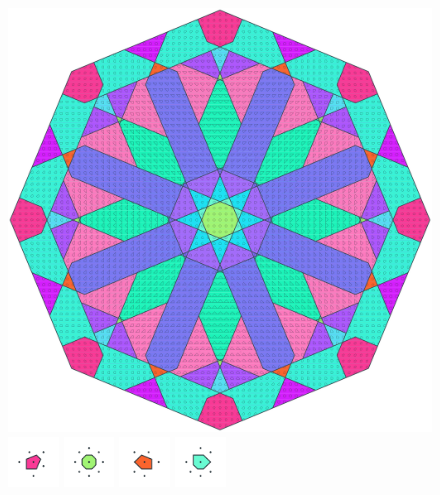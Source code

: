 \documentclass[text.tex]{subfiles}
\begin{document}
\clearpage
\pagestyle{fancy}
\fancyhf{}
\begin{figure}[h!]
\centering
\includegraphics[width=1\textwidth]{img/results/octagon/octagon_109619_(-27_13alpha_4).pdf}
\includegraphics[width=0.12\textwidth]{img/results/octagon/octagon_109619_(-27_13alpha_4)_001.pdf}
\includegraphics[width=0.12\textwidth]{img/results/octagon/octagon_109619_(-27_13alpha_4)_002.pdf}
\includegraphics[width=0.12\textwidth]{img/results/octagon/octagon_109619_(-27_13alpha_4)_003.pdf}
\includegraphics[width=0.12\textwidth]{img/results/octagon/octagon_109619_(-27_13alpha_4)_004.pdf}

\end{figure}
\end{document}
